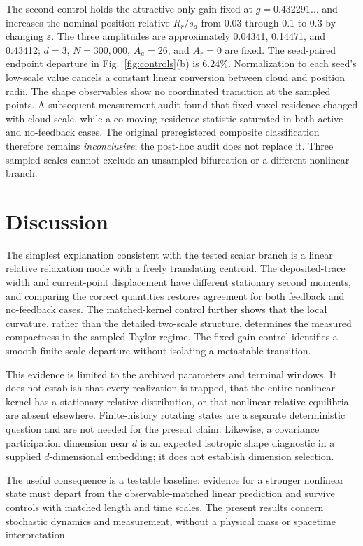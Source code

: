 The second control holds the attractive-only gain fixed at
$g=0.432291\ldots$ and increases the nominal position-relative
$R_r/s_a$ from 0.03 through 0.1 to 0.3 by changing $\varepsilon$.
The three amplitudes are approximately 0.04341, 0.14471, and 0.43412;
$d=3$, $N=300{,}000$, $A_a=26$, and $A_r=0$ are fixed.
The seed-paired endpoint departure in Fig.~\ref{fig:controls}(b) is
$6.24\%$. Normalization to each seed's low-scale value cancels a constant
linear conversion between cloud and position radii. The shape observables
show no coordinated transition at the sampled points. A subsequent
measurement audit found that fixed-voxel residence changed with cloud
scale, while a co-moving residence statistic saturated in both active and
no-feedback cases. The original preregistered composite classification
therefore remains \emph{inconclusive}; the post-hoc audit does not replace it.
Three sampled scales cannot exclude an unsampled bifurcation or a different
nonlinear branch.

\section{Discussion}
The simplest explanation consistent with the tested scalar branch is a
linear relative relaxation mode with a freely translating centroid.
The deposited-trace width and current-point displacement have different
stationary second moments, and comparing the correct quantities restores
agreement for both feedback and no-feedback cases. The matched-kernel
control further shows that the local curvature, rather than the detailed
two-scale structure, determines the measured compactness in the sampled
Taylor regime. The fixed-gain control identifies a smooth finite-scale
departure without isolating a metastable transition.

This evidence is limited to the archived parameters and terminal windows.
It does not establish that every realization is trapped, that the entire
nonlinear kernel has a stationary relative distribution, or that nonlinear
relative equilibria are absent elsewhere. Finite-history rotating states
are a separate deterministic question and are not needed for the present
claim. Likewise, a covariance participation dimension near $d$ is an
expected isotropic shape diagnostic in a supplied $d$-dimensional embedding;
it does not establish dimension selection.

The useful consequence is a testable baseline: evidence for a stronger
nonlinear state must depart from the observable-matched linear prediction
and survive controls with matched length and time scales. The present
results concern stochastic dynamics and measurement, without a physical
mass or spacetime interpretation.

